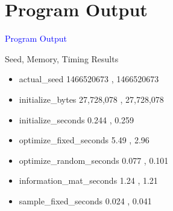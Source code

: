 \documentclass{beamer}
\newcommand{\Blue}[1]{\textcolor{blue}{#1}}
\newcommand{\Section}[1]{
	\section{#1}
	\begin{frame}
	\begin{center}
	\Blue{ \Large{#1} }
	\end{center}
	\end{frame}
}
\begin{document}
\Section{Program Output}
\begin{frame}{Seed, Memory, Timing Results}
\begin{itemize}

\item
actual\_seed
\hspace{5.9em} 1466520673 , 1466520673
\pause

\item
initialize\_bytes
\hspace{4.6em} 27,728,078 , 27,728,078
\pause

\item
initialize\_seconds
\hspace{3.6em} 0.244 , 0.259
\pause

\item
optimize\_fixed\_seconds
\hspace{1.3em} 5.49 , 2.96
\pause

\item
optimize\_random\_seconds
\hspace{0.05em} 0.077 , 0.101
\pause

\item
information\_mat\_seconds
\hspace{0.25em} 1.24 , 1.21
\pause

\item
sample\_fixed\_seconds
\hspace{1.9em} 0.024 , 0.041
\pause

\end{itemize}
\end{frame}
\end{document}
